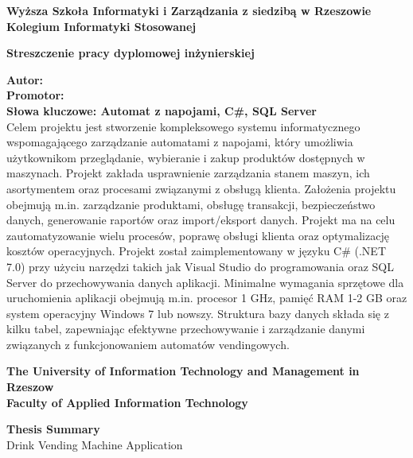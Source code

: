 \listoffigures
\newpage


\noindent
{\footnotesize{}\textbf{Wyższa Szkoła Informatyki i Zarządzania z siedzibą w Rzeszowie\\
Kolegium Informatyki Stosowanej}
\vspace{30pt}

\begin{center}
\textbf{Streszczenie pracy dyplomowej inżynierskiej}\\
\temat
\end{center}

\vspace{30pt}
\noindent
\textbf{Autor: \autor
\\Promotor: \promotor
\\Słowa kluczowe: Automat z napojami, C\#, SQL Server }
\vspace{40pt}
\\Celem projektu jest stworzenie kompleksowego systemu informatycznego wspomagającego zarządzanie automatami z napojami, który umożliwia użytkownikom przeglądanie, wybieranie i zakup produktów dostępnych w maszynach. Projekt zakłada usprawnienie zarządzania stanem maszyn, ich asortymentem oraz procesami związanymi z obsługą klienta. Założenia projektu obejmują m.in. zarządzanie produktami, obsługę transakcji, bezpieczeństwo danych, generowanie raportów oraz import/eksport danych. Projekt ma na celu zautomatyzowanie wielu procesów, poprawę obsługi klienta oraz optymalizację kosztów operacyjnych. \newline
Projekt został zaimplementowany w języku C\# (.NET 7.0) przy użyciu narzędzi takich jak Visual Studio do programowania oraz SQL Server do przechowywania danych aplikacji. Minimalne wymagania sprzętowe dla uruchomienia aplikacji obejmują m.in. procesor 1 GHz, pamięć RAM 1-2 GB oraz system operacyjny Windows 7 lub nowszy. \newline
Struktura bazy danych składa się z kilku tabel, zapewniając efektywne przechowywanie i zarządzanie danymi związanych z funkcjonowaniem automatów vendingowych.
\vspace{80pt}

\noindent
\textbf{The University of Information Technology and Management in Rzeszow\\
Faculty of Applied Information Technology}
\vspace{30pt}

\begin{center}
\textbf{Thesis Summary\\}
Drink Vending Machine Application
\end{center}

}
